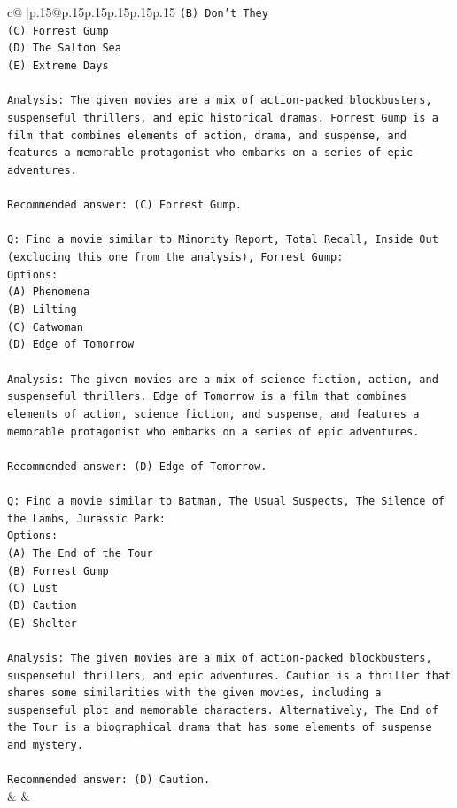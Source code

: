 \documentclass{article}
\begin{document}
{\begin{supertabular}{c@{$\;$}|p{.15\linewidth}@{}p{.15\linewidth}p{.15\linewidth}p{.15\linewidth}p{.15\linewidth}p{.15\linewidth}}
{{{\texttt{(B) Don't They} \\
\texttt{(C) Forrest Gump} \\
\texttt{(D) The Salton Sea} \\
\texttt{(E) Extreme Days} \\
\\ 
\texttt{Analysis: The given movies are a mix of action{-}packed blockbusters, suspenseful thrillers, and epic historical dramas. Forrest Gump is a film that combines elements of action, drama, and suspense, and features a memorable protagonist who embarks on a series of epic adventures.} \\
\\ 
\texttt{Recommended answer: (C) Forrest Gump.} \\
\\ 
\texttt{Q: Find a movie similar to Minority Report, Total Recall, Inside Out (excluding this one from the analysis), Forrest Gump:} \\
\texttt{Options:} \\
\texttt{(A) Phenomena} \\
\texttt{(B) Lilting} \\
\texttt{(C) Catwoman} \\
\texttt{(D) Edge of Tomorrow} \\
\\ 
\texttt{Analysis: The given movies are a mix of science fiction, action, and suspenseful thrillers. Edge of Tomorrow is a film that combines elements of action, science fiction, and suspense, and features a memorable protagonist who embarks on a series of epic adventures.} \\
\\ 
\texttt{Recommended answer: (D) Edge of Tomorrow.} \\
\\ 
\texttt{Q: Find a movie similar to Batman, The Usual Suspects, The Silence of the Lambs, Jurassic Park:} \\
\texttt{Options:} \\
\texttt{(A) The End of the Tour} \\
\texttt{(B) Forrest Gump} \\
\texttt{(C) Lust} \\
\texttt{(D) Caution} \\
\texttt{(E) Shelter} \\
\\ 
\texttt{Analysis: The given movies are a mix of action{-}packed blockbusters, suspenseful thrillers, and epic adventures. Caution is a thriller that shares some similarities with the given movies, including a suspenseful plot and memorable characters. Alternatively, The End of the Tour is a biographical drama that has some elements of suspense and mystery.} \\
\\ 
\texttt{Recommended answer: (D) Caution.} \\
            }
        }
    }
    & & \\ \\


\end{supertabular}}
\end{document}

